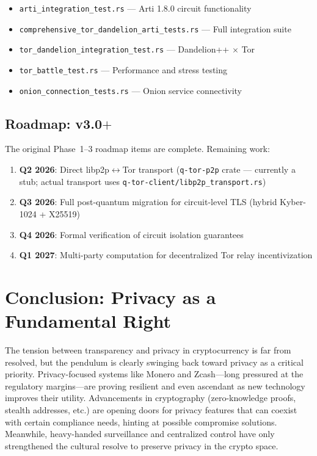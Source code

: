 \documentclass[11pt,a4paper]{article}
\begin{document}
\begin{itemize}[leftmargin=*]
    \item \texttt{arti\_integration\_test.rs} --- Arti 1.8.0 circuit functionality
    \item \texttt{comprehensive\_tor\_dandelion\_arti\_tests.rs} --- Full integration suite
    \item \texttt{tor\_dandelion\_integration\_test.rs} --- Dandelion++ $\times$ Tor
    \item \texttt{tor\_battle\_test.rs} --- Performance and stress testing
    \item \texttt{onion\_connection\_tests.rs} --- Onion service connectivity
\end{itemize}

\subsection{Roadmap: v3.0$+$}

The original Phase~1--3 roadmap items are complete. Remaining work:

\begin{enumerate}[leftmargin=*]
    \item \textbf{Q2 2026}: Direct libp2p$\leftrightarrow$Tor transport (\texttt{q-tor-p2p} crate --- currently a stub; actual transport uses \texttt{q-tor-client/libp2p\_transport.rs})
    \item \textbf{Q3 2026}: Full post-quantum migration for circuit-level TLS (hybrid Kyber-1024 + X25519)
    \item \textbf{Q4 2026}: Formal verification of circuit isolation guarantees
    \item \textbf{Q1 2027}: Multi-party computation for decentralized Tor relay incentivization
\end{enumerate}

\section{Conclusion: Privacy as a Fundamental Right}

The tension between transparency and privacy in cryptocurrency is far from resolved, but the pendulum is clearly swinging back toward privacy as a critical priority. Privacy-focused systems like Monero and Zcash---long pressured at the regulatory margins---are proving resilient and even ascendant as new technology improves their utility. Advancements in cryptography (zero-knowledge proofs, stealth addresses, etc.) are opening doors for privacy features that can coexist with certain compliance needs, hinting at possible compromise solutions. Meanwhile, heavy-handed surveillance and centralized control have only strengthened the cultural resolve to preserve privacy in the crypto space.
\end{document}
